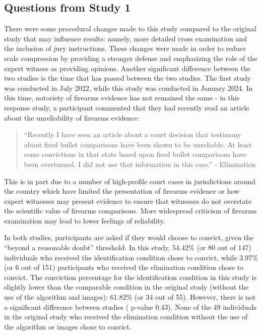 \documentclass[print]{nuthesis}
\begin{document}
\hypertarget{questions-from-study-1}{%
\subsection{Questions from Study 1}\label{questions-from-study-1}}

There were some procedural changes made to this study compared to the original study that may influence results: namely, more detailed cross examination and the inclusion of jury instructions.
These changes were made in order to reduce scale compression by providing a stronger defense and emphasizing the role of the expert witness as providing opinions.
Another significant difference between the two studies is the time that has passed between the two studies.
The first study was conducted in July 2022, while this study was conducted in January 2024.
In this time, notoriety of firearms evidence has not remained the same - in this response study, a participant commented that they had recently read an article about the unreliability of firearms evidence:

\begin{quote}
``Recently I have seen an article about a court decision that testimony about fired bullet comparisons have been shown to be unreliable. At least some convictions in that state based upon fired bullet comparisons have been overturned. I did not use that information in this case.'' - Elimination
\end{quote}

This is in part due to a number of high-profile court cases in jurisdictions around the country which have limited the presentation of firearms evidence or how expert witnesses may present evidence to ensure that witnesses do not overstate the scientific value of firearms comparisons.
More widespread criticism of firearms examination may lead to lower feelings of reliability.

In both studies, participants are asked if they would choose to convict, given the ``beyond a reasonable doubt'' threshold.
In this study, 54.42\% (or 80 out of 147) individuals who received the identification condition chose to convict, while 3.97\% (or 6 out of 151) participants who received the elimination condition chose to convict.
The conviction percentage for the identification condition in this study is slightly lower than the comparable condition in the original study (without the use of the algorithm and images): 61.82\% (or 34 out of 55).
However, there is not a significant difference between studies ( p-value 0.43).
None of the 49 individuals in the original study who received the elimination condition without the use of the algorithm or images chose to convict.
\end{document}
